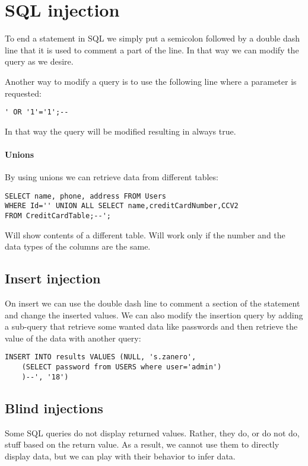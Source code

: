 \section{SQL injection}

To end a statement in SQL we simply put a semicolon followed by a double dash line that it is used to comment a part of the line. 
In that way we can modify the query as we desire. 

Another way to modify a query is to use the following line where a parameter is requested: 
\begin{verbatim}
' OR '1'='1';--
\end{verbatim}
In that way the query will be modified resulting in always true. 

\paragraph*{Unions}
By using unions we can retrieve data from different tables: 
\begin{verbatim}
SELECT name, phone, address FROM Users
WHERE Id='' UNION ALL SELECT name,creditCardNumber,CCV2 
FROM CreditCardTable;--';
\end{verbatim}
Will show contents of a different table.
Will work only if the number and the data types of the columns are the same.

\subsection{Insert injection}
On insert we can use the double dash line to comment a section of the statement and change the inserted values. 
We can also modify the insertion query by adding a sub-query that retrieve some wanted data like passwords and then retrieve the value of the data with another query: 
\begin{verbatim}
INSERT INTO results VALUES (NULL, 's.zanero',
    (SELECT password from USERS where user='admin')
    )--', '18')
\end{verbatim}

\subsection{Blind injections}
Some SQL queries do not display returned values. 
Rather, they do, or do not do, stuff based on the return value. 
As a result, we cannot use them to directly display data, but we can play with their behavior to infer data. 

